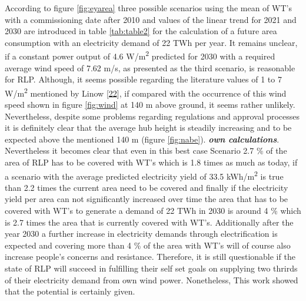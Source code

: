 \documentclass[a4paper,11pt]{article}
\begin{document}
According to figure \ref{fig:eyarea} three possible scenarios using the mean of WT's with a commissioning date after 2010 and values of the linear trend for 2021 and 2030 are introduced in table \ref{tab:table2} for the calculation of a future area consumption with an electricity demand of 22 TWh per year. It remains unclear, if a constant power output of 4.6 W/m\textsuperscript{2} predicted for 2030 with a required average wind speed of 7.62 m/s, as presented as the third scenario, is reasonable for RLP. Although, it seems possible regarding the literature values of 1 to 7 W/m\textsuperscript{2} mentioned by Linow {[}\protect\hyperlink{ref-SvenLinow.2020}{22}{]}, if compared with the occurrence of this wind speed shown in figure \ref{fig:wind} at 140 m above ground, it seems rather unlikely. Nevertheless, despite some problems regarding regulations and approval processes it is definitely clear that the average hub height is steadily increasing and to be expected above the mentioned 140 m (figure \ref{fig:nabe}). \textbf{\emph{own calculations}}. Nevertheless it becomes clear that even in this best case Scenario 2.7 \% of the area of RLP has to be covered with WT's which is 1.8 times as much as today, if a scenario with the average predicted electricity yield of 33.5 kWh/m\textsuperscript{2} is true than 2.2 times the current area need to be covered and finally if the electricity yield per area can not significantly increased over time the area that has to be covered with WT's to generate a demand of 22 TWh in 2030 is around 4 \% which is 2.7 times the area that is currently covered with WT's. Additionally after the year 2030 a further increase in electricity demands through electrification is expected and covering more than 4 \% of the area with WT's will of course also increase people's concerns and resistance. Therefore, it is still questionable if the state of RLP will succeed in fulfilling their self set goals on supplying two thrirds of their electricity demand from own wind power. Nonetheless, This work showed that the potential is certainly given.
\end{document}
